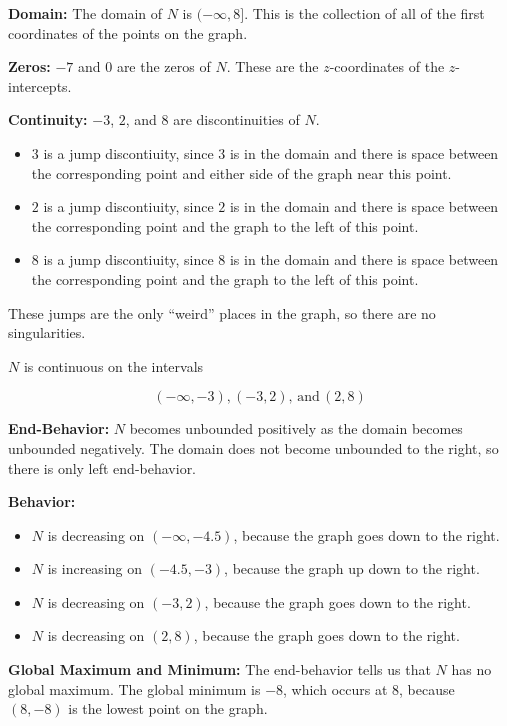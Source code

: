 \documentclass{ximera}
\begin{document}
\begin{example}
\textbf{Domain:}  The domain of $N$ is $(-\infty, 8]$. This is the collection of all of the first coordinates of the points on the graph.

\textbf{Zeros:}   $-7$ and $0$ are the zeros of $N$.  These are the $z$-coordinates of the $z$-intercepts. 

\textbf{Continuity:}  $-3$, $2$, and $8$ are discontinuities of $N$. 

\begin{itemize}
\item $3$ is a jump discontiuity, since $3$ is in the domain and there is space between the corresponding point and either side of the graph near this point. \\
\item $2$ is a jump discontiuity, since $2$ is in the domain and there is space between the corresponding point and the graph to the left of this point. \\
\item $8$ is a jump discontiuity, since $8$ is in the domain and there is space between the corresponding point and the graph to the left of this point. \\
\end{itemize}


These jumps are the only ``weird'' places in the graph, so there are no singularities. 


$N$ is continuous on the intervals

\[
(-\infty, -3), (-3, 2), \, \text{and} \, (2, 8)
\]


\textbf{End-Behavior:}  $N$ becomes unbounded positively as the domain becomes unbounded negatively.  The domain does not become unbounded to the right, so there is only left end-behavior.

\textbf{Behavior:}  

\begin{itemize}
     \item $N$ is decreasing on $(-\infty, -4.5)$, because the graph goes down to the right.
     \item $N$ is increasing on $(-4.5, -3)$, because the graph up down to the right.
     \item $N$ is decreasing on $(-3, 2)$, because the graph goes down to the right.
     \item $N$ is decreasing on $(2, 8)$, because the graph goes down to the right.
\end{itemize}



\textbf{Global Maximum and Minimum:} The end-behavior tells us that $N$ has no global maximum.  The global minimum is $-8$, which occurs at $8$, because $(8,-8)$ is the lowest point on the graph. 



\end{example}
\end{document}
